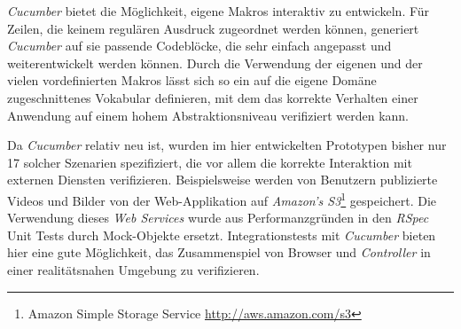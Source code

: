 \textit{Cucumber} bietet die Möglichkeit, eigene Makros interaktiv zu
entwickeln. Für Zeilen, die keinem regulären Ausdruck zugeordnet
werden können, generiert \textit{Cucumber} auf sie passende Codeblöcke, die
sehr einfach angepasst und weiterentwickelt werden können. Durch die
Verwendung der eigenen und der vielen vordefinierten Makros lässt sich
so ein auf die eigene Domäne zugeschnittenes Vokabular definieren, mit
dem das korrekte Verhalten einer Anwendung auf einem hohem
Abstraktionsniveau verifiziert werden kann.

Da \textit{Cucumber} relativ neu ist, wurden im hier entwickelten
Prototypen bisher nur 17 solcher Szenarien spezifiziert, die vor allem
die korrekte Interaktion mit externen Diensten
verifizieren. Beispielsweise werden von Benutzern publizierte Videos
und Bilder von der Web-Applikation auf \textit{Amazon's
  S3}\footnote{Amazon Simple Storage Service
  \url{http://aws.amazon.com/s3}} gespeichert. Die Verwendung dieses
\textit{Web Services} wurde aus Performanzgründen in den
\textit{RSpec} Unit Tests durch Mock-Objekte
ersetzt. Integrationstests mit \textit{Cucumber} bieten hier eine gute
Möglichkeit, das Zusammenspiel von Browser und \textit{Controller} in
einer realitätsnahen Umgebung zu verifizieren.

